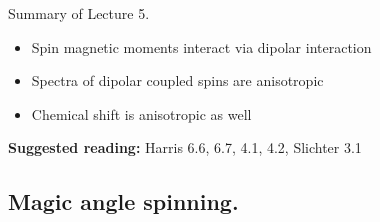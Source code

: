 \documentclass{beamer}
\begin{document}
\begin{frame}{Summary of Lecture 5.}
     \begin{itemize}
     	\item 	Spin magnetic moments interact via dipolar interaction
     	\item Spectra of dipolar coupled spins are anisotropic
     	\item Chemical shift is anisotropic as well
     \end{itemize}
     
     \textbf{Suggested reading:}  Harris 6.6, 6.7, 4.1, 4.2, Slichter 3.1
\end{frame}

\subsection{Magic angle spinning.}
\end{document}

